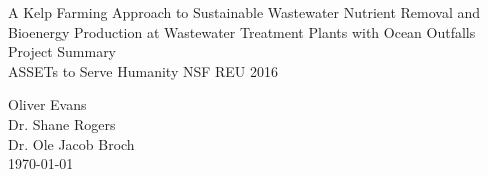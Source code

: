 \documentclass[10pt]{article}
\begin{document}
\null

\thispagestyle{empty}
\addtocounter{page}{-1}

\begin{center}
    \begin{sffamily}
	\begin{bfseries}
	    \null
	    \vfill
	    \Huge{A Kelp Farming Approach to Sustainable Wastewater Nutrient Removal and Bioenergy Production at Wastewater Treatment Plants with Ocean Outfalls} \\

	    \vspace{20pt}
	    \LARGE{Project Summary} \\
		\LARGE{ASSETs to Serve Humanity NSF REU 2016} \\
	    \vspace{20pt}
    \begin{Large}
		Oliver Evans \\
		Dr. Shane Rogers \\
		Dr. Ole Jacob Broch \\
	\vspace{20pt}
	\today
    \end{Large}
	\end{bfseries}
    \end{sffamily}
    \vspace{30pt}

    \null
    \vfill
    \vfill
    \null
\end{center}
\pagebreak


\renewcommand{\arraystretch}{1.5}
\end{document}
